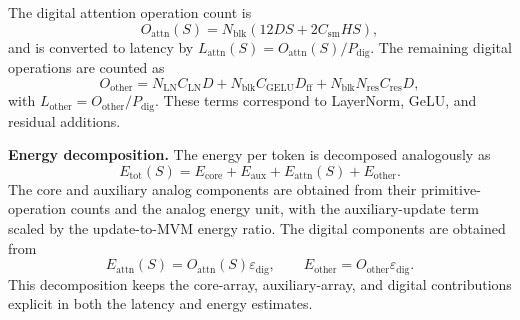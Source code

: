 \documentclass[fleqn,10pt]{wlscirep}
\begin{document}
\noindent
The digital attention operation count is
\begin{equation}
O_{\mathrm{attn}}(S)
=
N_{\mathrm{blk}}
\left(
12DS
+
2C_{\mathrm{sm}}HS
\right),
\label{eq:supp_attn_ops}
\end{equation}
and is converted to latency by \(L_{\mathrm{attn}}(S)=O_{\mathrm{attn}}(S)/P_{\mathrm{dig}}\). The remaining digital operations are counted as
\begin{equation}
O_{\mathrm{other}}
=
N_{\mathrm{LN}}C_{\mathrm{LN}}D
+
N_{\mathrm{blk}}C_{\mathrm{GELU}}D_{\mathrm{ff}}
+
N_{\mathrm{blk}}N_{\mathrm{res}}C_{\mathrm{res}}D,
\label{eq:supp_other_ops}
\end{equation}
with \(L_{\mathrm{other}}=O_{\mathrm{other}}/P_{\mathrm{dig}}\). These terms correspond to LayerNorm, GeLU, and residual additions.

\noindent\textbf{Energy decomposition.}
The energy per token is decomposed analogously as
\begin{equation}
E_{\mathrm{tot}}(S)
=
E_{\mathrm{core}}
+
E_{\mathrm{aux}}
+
E_{\mathrm{attn}}(S)
+
E_{\mathrm{other}}.
\label{eq:supp_total_energy}
\end{equation}
The core and auxiliary analog components are obtained from their primitive-operation counts and the analog energy unit, with the auxiliary-update term scaled by the update-to-MVM energy ratio. The digital components are obtained from
\begin{equation}
E_{\mathrm{attn}}(S)=O_{\mathrm{attn}}(S)\varepsilon_{\mathrm{dig}},
\qquad
E_{\mathrm{other}}=O_{\mathrm{other}}\varepsilon_{\mathrm{dig}}.
\label{eq:supp_digital_energy}
\end{equation}
This decomposition keeps the core-array, auxiliary-array, and digital contributions explicit in both the latency and energy estimates.
\end{document}
